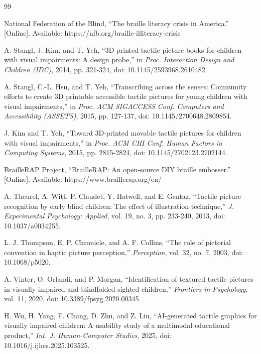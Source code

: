 \documentclass[conference]{IEEEtran}
\begin{document}
\begin{thebibliography}{99}

 National Federation of the Blind, ``The braille literacy crisis in America.'' [Online]. Available: https://nfb.org/braille-illiteracy-crisis

 A. Stangl, J. Kim, and T. Yeh, ``3D printed tactile picture books for children with visual impairments: A design probe,'' in \emph{Proc. Interaction Design and Children (IDC)}, 2014, pp. 321-324, doi: 10.1145/2593968.2610482.

 A. Stangl, C.-L. Hsu, and T. Yeh, ``Transcribing across the senses: Community efforts to create 3D printable accessible tactile pictures for young children with visual impairments,'' in \emph{Proc. ACM SIGACCESS Conf. Computers and Accessibility (ASSETS)}, 2015, pp. 127-137, doi: 10.1145/2700648.2809854.

 J. Kim and T. Yeh, ``Toward 3D-printed movable tactile pictures for children with visual impairments,'' in \emph{Proc. ACM CHI Conf. Human Factors in Computing Systems}, 2015, pp. 2815-2824, doi: 10.1145/2702123.2702144.

 BrailleRAP Project, ``BrailleRAP: An open-source DIY braille embosser.'' [Online]. Available: https://www.braillerap.org/en/

 A. Theurel, A. Witt, P. Claudet, Y. Hatwell, and E. Gentaz, ``Tactile picture recognition by early blind children: The effect of illustration technique,'' \emph{J. Experimental Psychology: Applied}, vol. 19, no. 3, pp. 233-240, 2013, doi: 10.1037/a0034255.

 L. J. Thompson, E. P. Chronicle, and A. F. Collins, ``The role of pictorial convention in haptic picture perception,'' \emph{Perception}, vol. 32, no. 7, 2003, doi: 10.1068/p5020.

 A. Vinter, O. Orlandi, and P. Morgan, ``Identification of textured tactile pictures in visually impaired and blindfolded sighted children,'' \emph{Frontiers in Psychology}, vol. 11, 2020, doi: 10.3389/fpsyg.2020.00345.

 H. Wu, H. Yang, F. Chang, D. Zhu, and Z. Liu, ``AI-generated tactile graphics for visually impaired children: A usability study of a multimodal educational product,'' \emph{Int. J. Human-Computer Studies}, 2025, doi: 10.1016/j.ijhcs.2025.103525.


\end{thebibliography}
\end{document}

